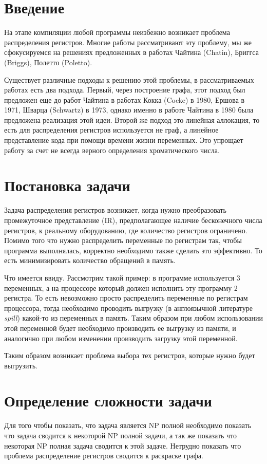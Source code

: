 \documentclass[12pt]{article}
\begin{document}
\section{Введение}

На этапе компиляции любой программы неизбежно возникает проблема распределения регистров. %
Многие работы рассматривают эту проблему, мы же сфокусируемся на решениях предложенных в
работах Чайтина (Chatin), Бриггса (Briggs), Полетто (Poletto). %

Существует различные подходы к решению этой проблемы, в рассматриваемых работах есть два
подхода. Первый, через построение графа, этот подход был предложен еще до работ Чайтина в
работах Кокка (Cocke) в 1980, Ершова в 1971, Шварца (Schwartz) в 1973, однако именно в
работе Чайтина в 1980 была предложена реализация этой идеи. Второй же подход это линейная аллокация,
то есть для распределения регистров используется не граф, а линейное представление кода при
помощи времени жизни переменных. Это упрощает работу за счет не всегда верного определения
хроматического числа. %

\section{Постановка задачи}
Задача распределения регистров возникает, когда нужно преобразовать промежуточное представление (IR),
предполагающее наличие бесконечного числа регистров, к реальному оборудованию, где количество регистров
ограничено. Помимо того что нужно распределить переменные по регистрам так, чтобы программа выполнялась,
корректно необходимо также сделать это эффективно. То есть минимизировать количество обращений в память.

Что имеется ввиду. Рассмотрим такой пример: в программе используется 3 переменных, а на процессоре
который должен исполнить эту программу 2 регистра. То есть невозможно просто распределить переменные
по регистрам процессора, тогда необходимо проводить выгрузку (в англоязычной литературе \textit{spill})
какой-то из переменных в память. Таким образом при любом использовании этой переменной будет необходимо
производить ее выгрузку из памяти, и аналогично при любом изменении производить загрузку этой переменной.

Таким образом возникает проблема выбора тех регистров, которые нужно будет выгрузить. %

\section{Определение сложности задачи}
\label{seg:complexity}
Для того чтобы показать, что задача является NP полной необходимо показать что задача сводится к
некоторой NP полной задачи, а так же показать что некоторая NP полная задача сводится к этой
задаче. Нетрудно показать что проблема распределение регистров сводится к раскраске графа.
\end{document}

